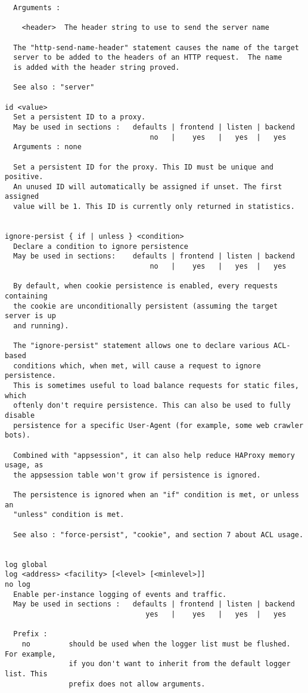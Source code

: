 \begin{verbatim}
  Arguments :

    <header>  The header string to use to send the server name

  The "http-send-name-header" statement causes the name of the target
  server to be added to the headers of an HTTP request.  The name
  is added with the header string proved.

  See also : "server"

id <value>
  Set a persistent ID to a proxy.
  May be used in sections :   defaults | frontend | listen | backend
                                  no   |    yes   |   yes  |   yes
  Arguments : none

  Set a persistent ID for the proxy. This ID must be unique and positive.
  An unused ID will automatically be assigned if unset. The first assigned
  value will be 1. This ID is currently only returned in statistics.


ignore-persist { if | unless } <condition>
  Declare a condition to ignore persistence
  May be used in sections:    defaults | frontend | listen | backend
                                  no   |    yes   |   yes  |   yes

  By default, when cookie persistence is enabled, every requests containing
  the cookie are unconditionally persistent (assuming the target server is up
  and running).

  The "ignore-persist" statement allows one to declare various ACL-based
  conditions which, when met, will cause a request to ignore persistence.
  This is sometimes useful to load balance requests for static files, which
  oftenly don't require persistence. This can also be used to fully disable
  persistence for a specific User-Agent (for example, some web crawler bots).

  Combined with "appsession", it can also help reduce HAProxy memory usage, as
  the appsession table won't grow if persistence is ignored.

  The persistence is ignored when an "if" condition is met, or unless an
  "unless" condition is met.

  See also : "force-persist", "cookie", and section 7 about ACL usage.


log global
log <address> <facility> [<level> [<minlevel>]]
no log
  Enable per-instance logging of events and traffic.
  May be used in sections :   defaults | frontend | listen | backend
                                 yes   |    yes   |   yes  |   yes

  Prefix :
    no         should be used when the logger list must be flushed. For example,
               if you don't want to inherit from the default logger list. This
               prefix does not allow arguments.


\end{verbatim}
